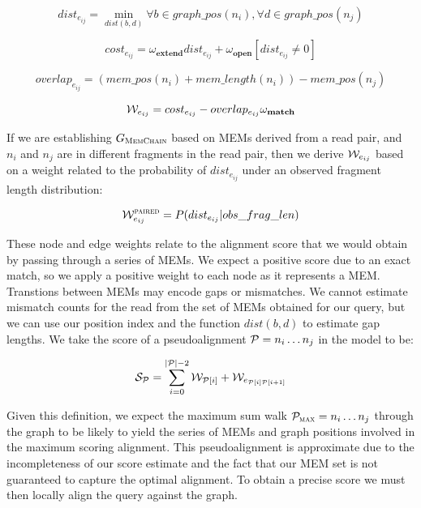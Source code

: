 \begin{equation}
  dist_{e_{ij}} = \min_{dist(b,d)} \forall b \in graph\_pos(n_i), \forall d \in graph\_pos(n_j)
\end{equation}

\begin{equation}
  cost_{e_{ij}} = \omega_\textbf{extend} dist_{e_{ij}} + \omega_\textbf{open} [dist_{e_{ij}} \ne 0]
\end{equation}

\begin{equation}
  overlap_{e_{ij}} = (mem\_pos(n_i) + mem\_length(n_i)) - mem\_pos(n_j)
\end{equation}

\begin{equation}
  {\cal W}_{e_{ij}} = cost_{e_{ij}} - overlap_{e_{ij}} \omega_\textbf{match}
\end{equation}

If we are establishing $G_\textsc{MemChain}$ based on MEMs derived from a read pair, and $n_i$ and $n_j$ are in different fragments in the read pair, then we derive ${\cal W}_{e_{ij}}$ based on a weight related to the probability of $dist_{e_{ij}}$ under an observed fragment length distribution:

\begin{equation}
  {\cal W}_{e_{ij}}^{\textsc{paired}} = P(dist_{e_{ij}} | obs\_frag\_len)
\end{equation}

These node and edge weights relate to the alignment score that we would obtain by passing through a series of MEMs.
We expect a positive score due to an exact match, so we apply a positive weight to each node as it represents a MEM.
Transtions between MEMs may encode gaps or mismatches.
We cannot estimate mismatch counts for the read from the set of MEMs obtained for our query, but we can use our position index and the function $dist(b,d)$ to estimate gap lengths.
We take the score of a pseudoalignment ${\cal P} = n_i \ldots n_j$ in the model to be:

\begin{equation}
  {\cal S}_{\cal P} = \sum_{i = 0}^{|{\cal P}|-2} {\cal W}_{{\cal P}[i]} + {\cal W}_{e_{{\cal P}[i]{\cal P}[i+1]}}
\end{equation}

Given this definition, we expect the maximum sum walk ${\cal P}_\textsc{max} = n_i \ldots n_j$ through the graph to be likely to yield the series of MEMs and graph positions involved in the maximum scoring alignment.
This pseudoalignment is approximate due to the incompleteness of our score estimate and the fact that our MEM set is not guaranteed to capture the optimal alignment.
To obtain a precise score we must then locally align the query against the graph.

